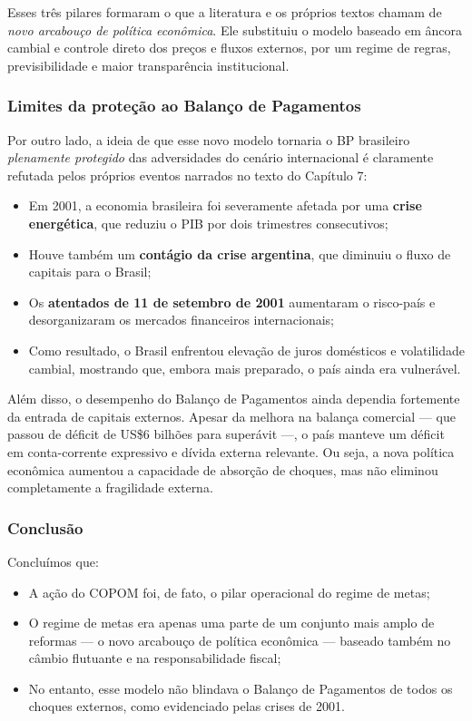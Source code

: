 \documentclass[a4paper,12pt]{article}[abntex2]
\begin{document}
Esses três pilares formaram o que a literatura e os próprios textos chamam de \textit{novo arcabouço de política econômica}. Ele substituiu o modelo baseado em âncora cambial e controle direto dos preços e fluxos externos, por um regime de regras, previsibilidade e maior transparência institucional.

\subsubsection{\textbf{Limites da proteção ao Balanço de Pagamentos}}

Por outro lado, a ideia de que esse novo modelo tornaria o BP brasileiro \textit{plenamente protegido} das adversidades do cenário internacional é claramente refutada pelos próprios eventos narrados no texto do Capítulo 7:

\begin{itemize}
    \item Em 2001, a economia brasileira foi severamente afetada por uma \textbf{crise energética}, que reduziu o PIB por dois trimestres consecutivos;
    \item Houve também um \textbf{contágio da crise argentina}, que diminuiu o fluxo de capitais para o Brasil;
    \item Os \textbf{atentados de 11 de setembro de 2001} aumentaram o risco-país e desorganizaram os mercados financeiros internacionais;
    \item Como resultado, o Brasil enfrentou elevação de juros domésticos e volatilidade cambial, mostrando que, embora mais preparado, o país ainda era vulnerável.
\end{itemize}

Além disso, o desempenho do Balanço de Pagamentos ainda dependia fortemente da entrada de capitais externos. Apesar da melhora na balança comercial — que passou de déficit de US\$6 bilhões para superávit —, o país manteve um déficit em conta-corrente expressivo e dívida externa relevante. Ou seja, a nova política econômica aumentou a capacidade de absorção de choques, mas não eliminou completamente a fragilidade externa.

\subsubsection{\textbf{Conclusão}}

Concluímos que:
\begin{itemize}
    \item A ação do COPOM foi, de fato, o pilar operacional do regime de metas;
    \item O regime de metas era apenas uma parte de um conjunto mais amplo de reformas — o novo arcabouço de política econômica — baseado também no câmbio flutuante e na responsabilidade fiscal;
    \item No entanto, esse modelo não blindava o Balanço de Pagamentos de todos os choques externos, como evidenciado pelas crises de 2001.
\end{itemize}
\end{document}
